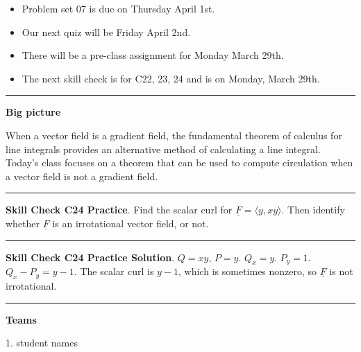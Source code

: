 \documentclass[12pt,letterpaper,noanswers]{exam}
\newcommand{\mb}[1]{\underline{#1}}
\begin{document}
 \pdfpageheight 11in 
  \pdfpagewidth 8.5in


\begin{itemize}
\itemsep0em
    \item Problem set 07 is due on Thursday April 1st.
    \item Our next quiz will be Friday April 2nd.
    \item There will be a pre-class assignment for Monday March 29th.
   \item The next skill check is for C22, 23, 24 and is on Monday, March 29th.
\end{itemize}

\hrule
\vspace{0.2cm}


\noindent\textbf{Big picture}

When a vector field is a gradient field, the fundamental theorem of calculus for line integrals provides an alternative method of calculating a line integral.  Today's class focuses on a theorem that can be used to compute circulation when a vector field is not a gradient field.

\vspace{0.2cm}
\hrule
\vspace{0.2cm}

\noindent\textbf{Skill Check C24 Practice}.  
 Find the scalar curl for $\mb F = \langle y, xy \rangle$.  Then identify whether $\mb F$ is an irrotational vector field, or not.

\vspace{0.2cm}
\hrule
\vspace{0.2cm}

\noindent\textbf{Skill Check C24 Practice Solution}.  
$Q = xy$, $P = y$.  $Q_x = y$.  $P_y = 1$.  $Q_x - P_y = y-1$.
The scalar curl is $y-1$, which is sometimes nonzero, so $\mb F$ is not irrotational.  

\vspace{0.2cm}
\hrule
\vspace{0.2cm}

\noindent\textbf{Teams}

\begin{multicols}{2}

1.  student names
\end{multicols}
\end{document}
